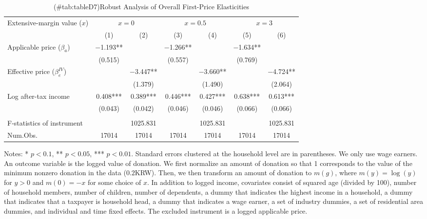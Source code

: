 \begin{table}

\caption{(\#tab:tableD7)Robust Analysis of Overall First-Price Elasticities\label{tab:ext-margin-value}}
\centering
\fontsize{8}{10}\selectfont
\begin{threeparttable}
\begin{tabular}[t]{lcccccc}
\toprule
\multicolumn{1}{c}{Extensive-margin value ($x$)} & \multicolumn{2}{c}{$x = 0$} & \multicolumn{2}{c}{$x = 0.5$} & \multicolumn{2}{c}{$x = 3$} \\
\cmidrule(l{3pt}r{3pt}){1-1} \cmidrule(l{3pt}r{3pt}){2-3} \cmidrule(l{3pt}r{3pt}){4-5} \cmidrule(l{3pt}r{3pt}){6-7}
  & (1) & (2) & (3) & (4) & (5) & (6)\\
\midrule
Applicable price ($\beta_a$) & \num{-1.193}** &  & \num{-1.266}** &  & \num{-1.634}** & \\
 & (\num{0.515}) &  & (\num{0.557}) &  & (\num{0.769}) & \\
Effective price ($\beta^{IV}_e$) &  & \num{-3.447}** &  & \num{-3.660}** &  & \num{-4.724}**\\
 &  & (\num{1.379}) &  & (\num{1.490}) &  & (\num{2.064})\\
Log after-tax income & \num{0.408}*** & \num{0.389}*** & \num{0.446}*** & \num{0.427}*** & \num{0.638}*** & \num{0.613}***\\
 & (\num{0.043}) & (\num{0.042}) & (\num{0.046}) & (\num{0.046}) & (\num{0.066}) & (\num{0.066})\\
\midrule
\addlinespace[0.3em]
\multicolumn{7}{l}{\textit{1st stage information (Excluded instrument: Applicable price)}}\\
\hspace{1em}F-statistics of instrument &  & \num{1025.831} &  & \num{1025.831} &  & \num{1025.831}\\
Num.Obs. & \num{17014} & \num{17014} & \num{17014} & \num{17014} & \num{17014} & \num{17014}\\
\bottomrule
\end{tabular}
\begin{tablenotes}
\item Notes: * $p < 0.1$, ** $p < 0.05$, *** $p < 0.01$. Standard errors clustered at the household level are in parentheses. We only use wage earners. An outcome variable is the logged value of donation. We first normalize an amount of donation so that 1 corresponds to the value of the minimum nonzero donation in the data ($0.2$KRW). Then, we then transform an amount of donation to $m(g)$, where $m(y) = \log(y)$ for $y > 0$ and $m(0) = -x$ for some choice of $x$. In addition to logged income, covariates consist of squared age (divided by 100), number of household members, number of children, number of dependents, a dummy that indicates the highest income in a household, a dummy that indicates that a taxpayer is household head, a dummy that indicates a wage earner, a set of industry dummies, a set of residential area dummies, and individual and time fixed effects. The excluded instrument is a logged applicable price.
\end{tablenotes}
\end{threeparttable}
\end{table}
